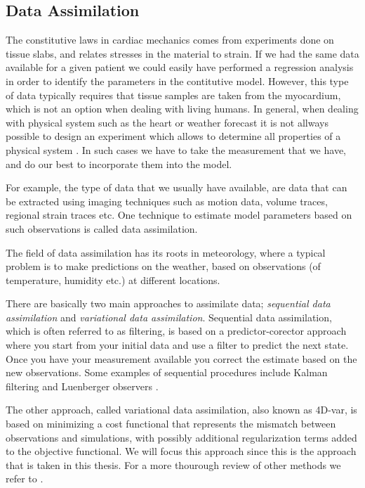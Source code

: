 \subsection{Data Assimilation}
The constitutive laws in cardiac mechanics comes from experiments
done on tissue slabs, and relates stresses in the material to strain.
If we had the same data available for a given patient we could easily
have performed a regression analysis in order to identify the
parameters in the contitutive model. However, this type of data
typically requires that tissue samples are taken from the myocardium,
which is not an option when dealing with living humans. In general,
when dealing with physical system such as the heart or weather
forecast it is not allways possible to design an experiment which
allows to determine all properties of a physical system
\cite{chapelle2013fundamental}. In such cases we have to take the
measurement that we have, and do our best to incorporate them into the
model. 

For example, the type of data that we usually have available, are data
that can be extracted using imaging techniques such as motion data,
volume traces, regional strain traces etc. One technique to estimate
model parameters based on such observations is called data assimilation.


The field of data assimilation has its roots in meteorology, where
a typical problem is to make predictions on the weather, based on
observations (of temperature, humidity etc.) at different locations. 


There are basically two main approaches to assimilate data;
\emph{sequential data assimilation} and \emph{variational data
  assimilation}. Sequential data assimilation, which is often
referred to as filtering, is based on a predictor-corector approach
where you start from your initial data and use a filter to predict the
next state. Once you have your measurement available you correct the
estimate based on the new observations. Some examples of sequential
procedures include Kalman filtering and Luenberger observers
\cite{chapelle2013fundamental}.

The other approach, called variational data assimilation, also known as
4D-var, is based on minimizing a cost functional that
represents the mismatch between observations and simulations, with
possibly additional regularization terms added to the objective
functional. We will focus this approach since this is the approach
that is taken in this thesis. For a more thourough review of other
methods we refer to \cite{chapelle2013fundamental}.


